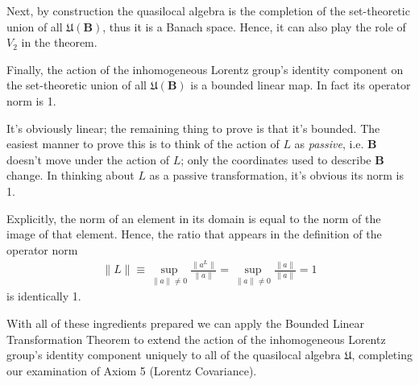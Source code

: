 Next, by construction the quasilocal algebra is the completion of the set-theoretic union of all $\mathfrak{U}(\mathbf{B})$, thus it is a Banach space. Hence, it can also play the role of $V_2$ in the theorem.

Finally, the action of the inhomogeneous Lorentz group's identity component on the set-theoretic union of all $\mathfrak{U}(\mathbf{B})$ is a bounded linear map. In fact its operator norm is 1.

It's obviously linear; the remaining thing to prove is that it's bounded. The easiest manner to prove this is to think of the action of $L$ as \textit{passive}, i.e. $\mathbf{B}$ doesn't move under the action of $L$; only the coordinates used to describe $\mathbf{B}$ change. In thinking about $L$ as a passive transformation, it's obvious its norm is 1.

Explicitly, the norm of an element in its domain is equal to the norm of the image of that element. Hence, the ratio that appears in the definition of the operator norm
\begin{align}
    \|L\| \equiv \sup\limits_{\|a\| \ne 0} \frac{\|a^L\|}{\|a\|} = \sup\limits_{\|a\| \ne 0} \frac{\|a\|}{\|a\|} = 1
\end{align}
is identically 1.

With all of these ingredients prepared we can apply the Bounded Linear Transformation Theorem to extend the action of the inhomogeneous Lorentz group's identity component uniquely to all of the quasilocal algebra $\mathfrak{U}$, completing our examination of Axiom 5 (Lorentz Covariance).
